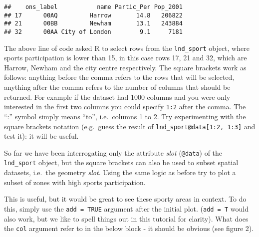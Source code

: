 \documentclass[]{article}
\newenvironment{Shaded}{}{}
\newcommand{\KeywordTok}[1]{\textcolor[rgb]{0.00,0.44,0.13}{\textbf{{#1}}}}
\newcommand{\DecValTok}[1]{\textcolor[rgb]{0.25,0.63,0.44}{{#1}}}
\newcommand{\StringTok}[1]{\textcolor[rgb]{0.25,0.44,0.63}{{#1}}}
\newcommand{\CommentTok}[1]{\textcolor[rgb]{0.38,0.63,0.69}{\textit{{#1}}}}
\newcommand{\NormalTok}[1]{{#1}}
\begin{document}
\begin{Shaded}
\end{Shaded}

\begin{verbatim}
##    ons_label           name Partic_Per Pop_2001
## 17      00AQ         Harrow       14.8   206822
## 21      00BB         Newham       13.1   243884
## 32      00AA City of London        9.1     7181
\end{verbatim}

The above line of code asked R to select rows from the
\texttt{lnd\_sport} object, where sports participation is lower than 15,
in this case rows 17, 21 and 32, which are Harrow, Newham and the city
centre respectively. The square brackets work as follows: anything
before the comma refers to the rows that will be selected, anything
after the comma refers to the number of columns that should be returned.
For example if the dataset had 1000 columns and you were only interested
in the first two columns you could specify \texttt{1:2} after the comma.
The ``:'' symbol simply means ``to'', i.e.~columns 1 to 2. Try
experimenting with the square brackets notation (e.g.~guess the result
of \texttt{lnd\_sport@data{[}1:2, 1:3{]}} and test it): it will be
useful.

So far we have been interrogating only the attribute \emph{slot}
(\texttt{@data}) of the \texttt{lnd\_sport} object, but the square
brackets can also be used to subset spatial datasets, i.e.~the geometry
\emph{slot}. Using the same logic as before try to plot a subset of
zones with high sports participation.

\begin{Shaded}
\end{Shaded}

This is useful, but it would be great to see these sporty areas in
context. To do this, simply use the \texttt{add = TRUE} argument after
the initial plot. (\texttt{add = T} would also work, but we like to
spell things out in this tutorial for clarity). What does the
\texttt{col} argument refer to in the below block - it should be obvious
(see figure 2).
\end{document}
